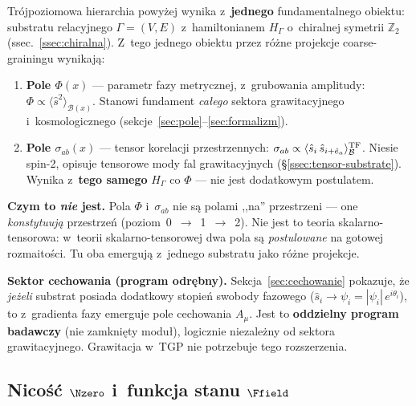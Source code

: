 \begin{remark}\label{rem:jeden-substrat}
Tr\'ojpoziomowa hierarchia powy\.zej wynika z~\textbf{jednego}
fundamentalnego obiektu: substratu relacyjnego $\Gamma = (V,E)$
z~hamiltonianem $H_\Gamma$ o~chiralnej symetrii $\mathbb{Z}_2$
(ssec.~\ref{ssec:chiralna}). Z~tego jednego obiektu
przez r\'o\.zne projekcje coarse-grainingu wynikaj\k{a}:

\begin{enumerate}[nosep]
  \item \textbf{Pole $\Phi(x)$} --- parametr fazy metrycznej,
    z~grubowania amplitudy: $\Phi \propto \langle\hat{s}^2\rangle_{\mathcal{B}(x)}$.
    Stanowi fundament \emph{ca\l{}ego} sektora grawitacyjnego
    i~kosmologicznego (sekcje~\ref{sec:pole}--\ref{sec:formalizm}).
  \item \textbf{Pole $\sigma_{ab}(x)$} --- tensor korelacji przestrzennych:
    $\sigma_{ab} \propto \langle\hat{s}_i\,\hat{s}_{i+\hat{e}_a}\rangle_{\mathcal{B}}^{\rm TF}$.
    Niesie spin-2, opisuje tensorowe mody fal grawitacyjnych
    (\S\ref{ssec:tensor-substrate}).
    Wynika z~\textbf{tego samego} $H_\Gamma$ co $\Phi$ ---
    nie jest dodatkowym postulatem.
\end{enumerate}

\noindent\textbf{Czym to \emph{nie} jest.}
Pola $\Phi$ i~$\sigma_{ab}$ nie s\k{a} polami ,,na'' przestrzeni ---
one \emph{konstytuuj\k{a}} przestrze\'n (poziom~0~$\to$~1~$\to$~2).
Nie jest to teoria skalarno-tensorowa: w~teorii skalarno-tensorowej
dwa pola s\k{a} \emph{postulowane} na gotowej rozmaito\'sci.
Tu oba emerguj\k{a} z~jednego substratu jako r\'o\.zne projekcje.

\medskip
\noindent\textbf{Sektor cechowania (program odrębny).}
Sekcja~\ref{sec:cechowanie} pokazuje, \.ze \emph{je\.zeli} substrat
posiada dodatkowy stopie\'n swobody fazowego
($\hat{s}_i \to \psi_i = |\psi_i|\,e^{i\theta_i}$),
to z~gradienta fazy emerguje pole cechowania $A_\mu$.
Jest to \textbf{oddzielny program badawczy} (nie zamkni\k{e}ty modu\l{}),
logicznie niezale\.zny od sektora grawitacyjnego.
Grawitacja w~TGP nie potrzebuje tego rozszerzenia.
\end{remark}

\subsection{Nico\'s\'c $\Nzero$ i~funkcja stanu $\Ffield$}\label{ssec:N0}

